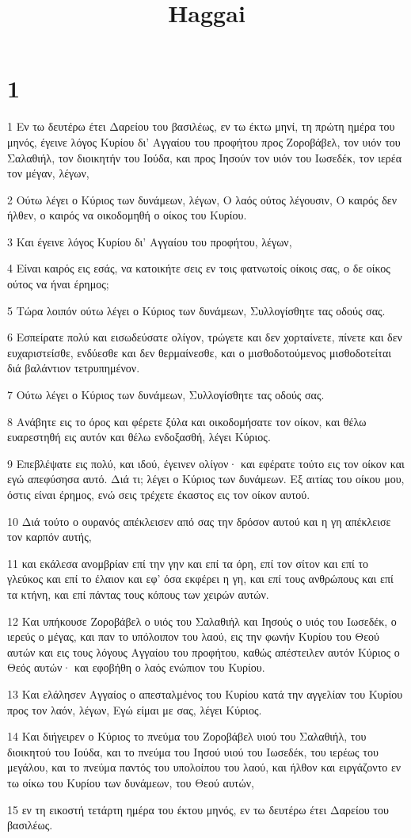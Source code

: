 

\title{Haggai}


\chapter{1}

\par 1 Εν τω δευτέρω έτει Δαρείου του βασιλέως, εν τω έκτω μηνί, τη πρώτη ημέρα του μηνός, έγεινε λόγος Κυρίου δι' Αγγαίου του προφήτου προς Ζοροβάβελ, τον υιόν του Σαλαθιήλ, τον διοικητήν του Ιούδα, και προς Ιησούν τον υιόν του Ιωσεδέκ, τον ιερέα τον μέγαν, λέγων,
\par 2 Ούτω λέγει ο Κύριος των δυνάμεων, λέγων, Ο λαός ούτος λέγουσιν, Ο καιρός δεν ήλθεν, ο καιρός να οικοδομηθή ο οίκος του Κυρίου.
\par 3 Και έγεινε λόγος Κυρίου δι' Αγγαίου του προφήτου, λέγων,
\par 4 Είναι καιρός εις εσάς, να κατοικήτε σεις εν τοις φατνωτοίς οίκοις σας, ο δε οίκος ούτος να ήναι έρημος;
\par 5 Τώρα λοιπόν ούτω λέγει ο Κύριος των δυνάμεων, Συλλογίσθητε τας οδούς σας.
\par 6 Εσπείρατε πολύ και εισωδεύσατε ολίγον, τρώγετε και δεν χορταίνετε, πίνετε και δεν ευχαριστείσθε, ενδύεσθε και δεν θερμαίνεσθε, και ο μισθοδοτούμενος μισθοδοτείται διά βαλάντιον τετρυπημένον.
\par 7 Ούτω λέγει ο Κύριος των δυνάμεων, Συλλογίσθητε τας οδούς σας.
\par 8 Ανάβητε εις το όρος και φέρετε ξύλα και οικοδομήσατε τον οίκον, και θέλω ευαρεστηθή εις αυτόν και θέλω ενδοξασθή, λέγει Κύριος.
\par 9 Επεβλέψατε εις πολύ, και ιδού, έγεινεν ολίγον· και εφέρατε τούτο εις τον οίκον και εγώ απεφύσησα αυτό. Διά τι; λέγει ο Κύριος των δυνάμεων. Εξ αιτίας του οίκου μου, όστις είναι έρημος, ενώ σεις τρέχετε έκαστος εις τον οίκον αυτού.
\par 10 Διά τούτο ο ουρανός απέκλεισεν από σας την δρόσον αυτού και η γη απέκλεισε τον καρπόν αυτής,
\par 11 και εκάλεσα ανομβρίαν επί την γην και επί τα όρη, επί τον σίτον και επί το γλεύκος και επί το έλαιον και εφ' όσα εκφέρει η γη, και επί τους ανθρώπους και επί τα κτήνη, και επί πάντας τους κόπους των χειρών αυτών.
\par 12 Και υπήκουσε Ζοροβάβελ ο υιός του Σαλαθιήλ και Ιησούς ο υιός του Ιωσεδέκ, ο ιερεύς ο μέγας, και παν το υπόλοιπον του λαού, εις την φωνήν Κυρίου του Θεού αυτών και εις τους λόγους Αγγαίου του προφήτου, καθώς απέστειλεν αυτόν Κύριος ο Θεός αυτών· και εφοβήθη ο λαός ενώπιον του Κυρίου.
\par 13 Και ελάλησεν Αγγαίος ο απεσταλμένος του Κυρίου κατά την αγγελίαν του Κυρίου προς τον λαόν, λέγων, Εγώ είμαι με σας, λέγει Κύριος.
\par 14 Και διήγειρεν ο Κύριος το πνεύμα του Ζοροβάβελ υιού του Σαλαθιήλ, του διοικητού του Ιούδα, και το πνεύμα του Ιησού υιού του Ιωσεδέκ, του ιερέως του μεγάλου, και το πνεύμα παντός του υπολοίπου του λαού, και ήλθον και ειργάζοντο εν τω οίκω του Κυρίου των δυνάμεων, του Θεού αυτών,
\par 15 εν τη εικοστή τετάρτη ημέρα του έκτου μηνός, εν τω δευτέρω έτει Δαρείου του βασιλέως.

